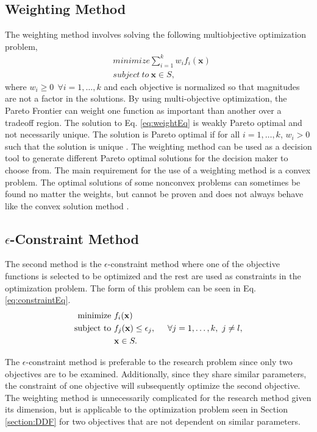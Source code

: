 \subsection*{Weighting Method}
The weighting method involves solving the following multiobjective optimization problem,
\begin{equation}
\begin{aligned}
    & minimize \sum^k_{i=1} w_if_i(\mathbf{x})\\
    & subject \ to \ \mathbf{x}\in S,
\end{aligned}
\label{eq:weightEq}
\end{equation}
where $w_i\geq 0 \ \ \forall i = 1,\dots,k$ and each objective is normalized so that magnitudes are not a factor in the solutions. By using multi-objective optimization, the Pareto Frontier can weight one function as important than another over a tradeoff region. The solution to Eq. \ref{eq:weightEq} is weakly Pareto optimal and not necessarily unique. The solution is Pareto optimal if for all $i = 1,\dots,k$, $w_i>0$ such that the solution is unique \cite{MultOptCS}. The weighting method can be used as a decision tool to generate different Pareto optimal solutions for the decision maker to choose from. The main requirement for the use of a weighting method is a convex problem. The optimal solutions of some nonconvex problems can sometimes be found no matter the weights, but cannot be proven and does not always behave like the convex solution method \cite{MultOptCS}.\par
\subsection*{$\epsilon$-Constraint Method}
The second method is the $\epsilon$-constraint method where one of the objective functions is selected to be optimized and the rest are used as constraints in the optimization problem. The form of this problem can be seen in Eq. \ref{eq:constraintEq}.
\begin{equation}
    \begin{aligned}
    \text{minimize} \ & f_i(\mathbf{x})\\
    \text{subject to} \ & f_j(\mathbf{x})\leq \epsilon_j, \hspace{0.5cm} \forall j = 1,\dots,k, \ j\neq l,\\
    & \mathbf{x}\in S.
    \end{aligned}
    \label{eq:constraintEq}
\end{equation}
\par
The $\epsilon$-constraint method is preferable to the research problem since only two objectives are to be examined. Additionally, since they share similar parameters, the constraint of one objective will subsequently optimize the second objective. The weighting method is unnecessarily complicated for the research method given its dimension, but is applicable to the optimization problem seen in Section \ref{section:DDF} for two objectives that are not dependent on similar parameters.

